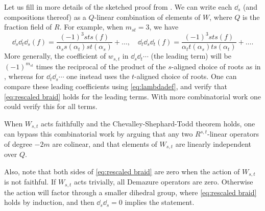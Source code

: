 \begin{remark} Let us fill in more details of the sketched proof from \cite[Claim A.7]{ECathedral}. We can write each $\dd_s$ (and compositions thereof) as a $Q$-linear combination of elements of $W$, where $Q$ is the fraction field of $R$. For example, when $m_{st} = 3$, we have
\begin{equation} \dd_s \dd_t \dd_s(f) = \frac{(-1)^3 sts(f)}{\alpha_s s(\alpha_t) st(\alpha_s)} + \ldots, \quad \dd_t \dd_s \dd_t(f) =\frac{(-1)^3 sts(f)}{\alpha_t t(\alpha_s) ts(\alpha_t)} + \ldots.\end{equation}
More generally, the coefficient of $w_{s,t}$ in $\dd_s \dd_t \cdots$ (the leading term) will be $(-1)^{m_{st}}$ times the reciprocal of the product of the $s$-aligned choice of roots as in \cite[Definition A.6]{ECathedral}, whereas for $\dd_t \dd_s \cdots$ one instead uses the $t$-aligned choice of roots. One can compare these leading coefficients using \eqref{eq:lambdadef}, and verify that \eqref{eq:rescaled braid} holds for the leading terms. With more combinatorial work one could verify this for all terms. \end{remark}

\begin{remark}
When $W_{s,t}$ acts faithfully and the Chevalley-Shephard-Todd theorem holds, one can bypass this combinatorial work by arguing that any two $R^{s,t}$-linear operators of degree $-2m$ are colinear, and that elements of $W_{s,t}$ are linearly independent over $Q$.

Also, note that both sides of \eqref{eq:rescaled braid} are zero when the action of $W_{s,t}$ is not faithful. If $W_{s,t}$ acts trivially, all Demazure operators are zero. Otherwise the action will factor through a smaller dihedral group, where \eqref{eq:rescaled braid} holds by induction, and then $\dd_s \dd_s=0$ implies the statement.
\end{remark}




